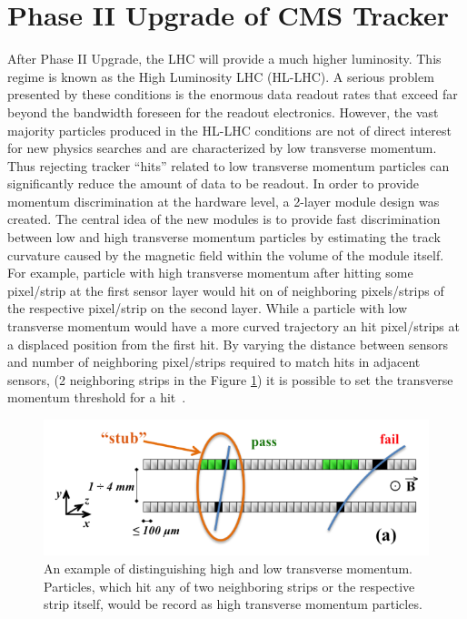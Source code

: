 \section{Phase II Upgrade of CMS Tracker}

After Phase II Upgrade, the LHC will provide a much higher luminosity. This regime is known as the High Luminosity LHC (HL-LHC). A serious problem presented by these conditions is the enormous data readout rates that exceed far beyond the bandwidth foreseen for the readout electronics.
However, the vast majority particles produced in the HL-LHC conditions are not of direct interest for new physics searches and are characterized by low transverse momentum. Thus rejecting tracker “hits” related to low transverse momentum particles can significantly reduce the amount of data to be readout. In order to provide momentum discrimination at the hardware level, a 2-layer module design was created. The central idea of the new modules is to provide fast discrimination between low and high transverse momentum particles by estimating the track curvature caused by the magnetic field within the volume of the module itself. For example, particle with high transverse momentum after hitting some pixel/strip at the first sensor layer would hit on of neighboring pixels/strips of the respective pixel/strip on the second layer. While a particle with low transverse momentum would have a more curved trajectory an hit pixel/strips at a displaced position from the first hit. By varying the distance between sensors and number of neighboring pixel/strips required to match hits in adjacent sensors, (2 neighboring strips in the Figure \ref{fig:low_high_pT}) it is possible to set the transverse momentum threshold for a hit~\cite{CMS_TECH_PHASE_II}.


\begin{figure}[ht]\centering
\includegraphics[width=0.8\linewidth]{Data/Introduction/Low_high_pT.png}
\caption{An example of distinguishing high and low transverse momentum. Particles, which hit any of two neighboring strips or the respective strip itself, would be record as high transverse momentum particles.}
\label{fig:low_high_pT}
\end{figure}


